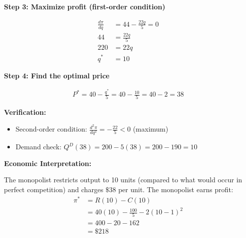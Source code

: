 \documentclass[11pt]{article}
\begin{document}
\textbf{Step 3: Maximize profit (first-order condition)}

\begin{align*}
    \frac{d\pi}{dq} &= 44 - \frac{22q}{5} = 0 \\
    44 &= \frac{22q}{5} \\
    220 &= 22q \\
    q^* &= 10
\end{align*}

\textbf{Step 4: Find the optimal price}

\begin{align*}
    P^* = 40 - \frac{q^*}{5} = 40 - \frac{10}{5} = 40 - 2 = 38
\end{align*}

\textbf{Verification:}
\begin{itemize}
    \item Second-order condition: $\frac{d^2\pi}{dq^2} = -\frac{22}{5} < 0$ \checkmark (maximum)
    \item Demand check: $Q^D(38) = 200 - 5(38) = 200 - 190 = 10$ \checkmark
\end{itemize}

\vspace{0.3cm}


\vspace{0.3cm}

\textbf{Economic Interpretation:}

The monopolist restricts output to 10 units (compared to what would occur in perfect competition) and charges $\$38$ per unit. The monopolist earns profit:
\begin{align*}
    \pi^* &= R(10) - C(10) \\
    &= 40(10) - \frac{100}{5} - 2(10-1)^2 \\
    &= 400 - 20 - 162 \\
    &= \$218
\end{align*}
\end{document}

